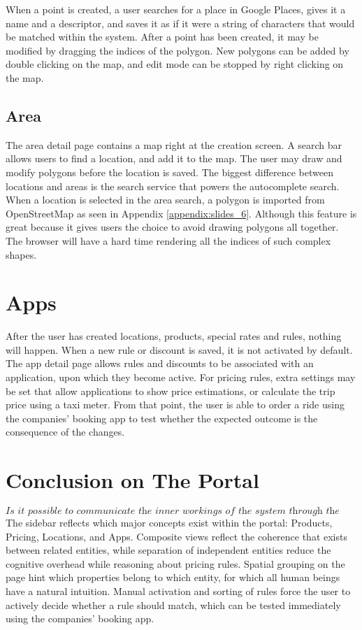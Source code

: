 When a point is created, a user searches for a place in Google Places, gives it a name and a descriptor, and saves it as if it were a string of characters that would be matched within the system. After a point has been created, it may be modified by dragging the indices of the polygon. New polygons can be added by double clicking on the map, and edit mode can be stopped by right clicking on the map.

\subsection{Area}
The area detail page contains a map right at the creation screen. A search bar allows users to find a location, and add it to the map. The user may draw and modify polygons before the location is saved. The biggest difference between locations and areas is the search service that powers the autocomplete search. When a location is selected in the area search, a polygon is imported from OpenStreetMap as seen in Appendix \ref{appendix:slides_6}. Although this feature is great because it gives users the choice to avoid drawing polygons all together. The browser will have a hard time rendering all the indices of such complex shapes.

\section{Apps}
After the user has created locations, products, special rates and rules, nothing will happen. When a new rule or discount is saved, it is not activated by default. The app detail page allows rules and discounts to be associated with an application, upon which they become active. For pricing rules, extra settings may be set that allow applications to show price estimations, or calculate the trip price using a taxi meter. From that point, the user is able to order a ride using the companies' booking app to test whether the expected outcome is the consequence of the changes.

\section{Conclusion on The Portal}
\[\textit{Is it possible to communicate the inner workings of the system through the user interface?}\]\hfill
The sidebar reflects which major concepts exist within the portal: Products, Pricing, Locations, and Apps. Composite views reflect the coherence that exists between related entities, while separation of independent entities reduce the cognitive overhead while reasoning about pricing rules. Spatial grouping on the page hint which properties belong to which entity, for which all human beings have a natural intuition. Manual activation and sorting of rules force the user to actively decide whether a rule should match, which can be tested immediately using the companies' booking app.
